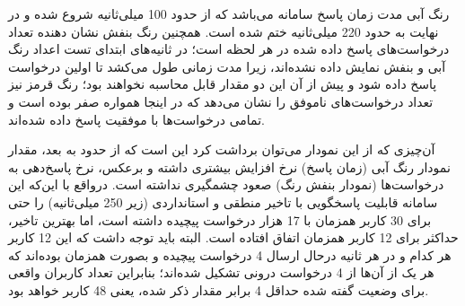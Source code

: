رنگ آبی مدت زمان پاسخ سامانه می‌باشد که از حدود 100 میلی‌ثانیه شروع شده و در نهایت به حدود 220 میلی‌ثانیه ختم شده است. همچنین رنگ بنفش نشان دهنده تعداد درخواست‌های پاسخ داده شده در هر لحظه است؛ در ثانیه‌های ابتدای تست اعداد رنگ آبی و بنفش نمایش داده نشده‌اند، زیرا مدت زمانی طول می‌کشد تا اولین درخواست پاسخ داده شود و پیش از آن این دو مقدار قابل محاسبه نخواهند بود؛ رنگ قرمز نیز تعداد درخواست‌های ناموفق را نشان می‌دهد که در اینجا همواره صفر بوده است و تمامی درخواست‌ها با موفقیت پاسخ داده شده‌اند.

آن‌چیزی که از این نمودار می‌توان برداشت کرد این است که از حدود  به بعد، مقدار نمودار رنگ آبی (زمان پاسخ) نرخ افزایش بیشتری داشته و برعکس، نرخ پاسخ‌دهی به درخواست‌ها (نمودار بنفش رنگ) صعود چشمگیری نداشته است. درواقع با این‌که این سامانه قابلیت پاسخگویی با تاخیر منطقی و استانداردی (زیر 250 میلی‌ثانیه) را حتی برای 30 کاربر همزمان با 17 هزار درخواست پیچیده داشته است، اما بهترین تاخیر، حداکثر برای 12 کاربر همزمان اتفاق افتاده است. البته باید توجه داشت که این 12 کاربر هر کدام و در هر ثانیه درحال ارسال 4 درخواست پیچیده و بصورت همزمان بوده‌اند که هر یک از آن‌ها از 4 درخواست درونی تشکیل شده‌اند؛ بنابراین تعداد کاربران واقعی برای وضعیت گفته شده حداقل 4 برابر مقدار ذکر شده، یعنی 48 کاربر خواهد بود.
